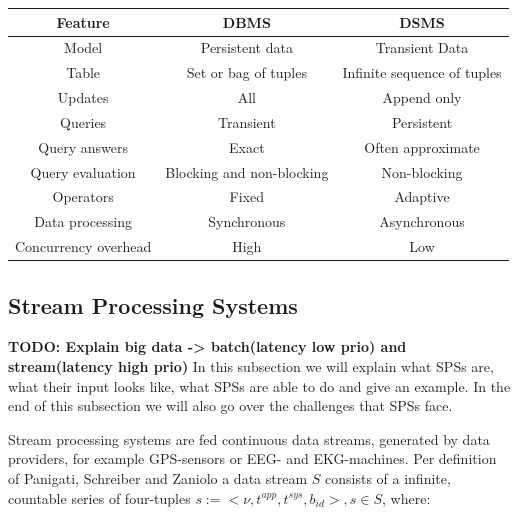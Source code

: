         \begin{table}[h]
            \centering
            \label{tab:dbms-dsms}
            \begin{tabular}{|c|c|c|} \hline
                \textbf{Feature} & \textbf{DBMS} & \textbf{DSMS} \\ \hline
                Model & Persistent data & Transient Data \\ \hline
                Table & Set or bag of tuples & Infinite sequence of tuples \\ \hline
                Updates & All & Append only \\ \hline
                Queries & Transient & Persistent \\ \hline
                Query answers & Exact & Often approximate \\ \hline
                Query evaluation & Blocking and non-blocking & Non-blocking \\ \hline
                Operators & Fixed & Adaptive \\ \hline
                Data processing & Synchronous & Asynchronous \\ \hline
                Concurrency overhead  & High & Low \\ \hline
            \end{tabular}
        \end{table}

        \subsection{Stream Processing Systems}
        \label{sub:sps}
        \textbf{TODO: Explain big data -> batch(latency low prio) and stream(latency high prio) }
        In this subsection we will explain what SPSs are, what their input looks like, what SPSs are able to do and give an example.
        In the end of this subsection we will also go over the challenges that SPSs face.

        Stream processing systems are fed continuous data streams, generated by data providers, for example GPS-sensors or EEG- and EKG-machines.
        Per definition of Panigati, Schreiber and Zaniolo\cite{Panigati2015} a data stream $S$ consists of a infinite, countable series of four-tuples $s := <\nu, t^{app }, t^{sys}, b_{id}>, s \in S$, where:

